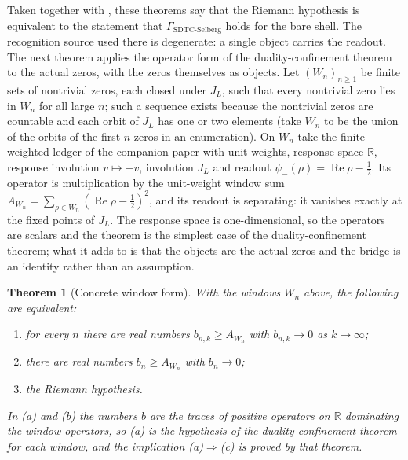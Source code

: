 \documentclass[11pt]{article}
\DeclareMathOperator{\Real}{Re}
\newcommand{\JL}{J_{L}}
\newcommand{\psimRH}{\psi_{-}}
\newcommand{\GamSDTCSelberg}{\Gamma_{\mathrm{SDTC\text{-}Selberg}}}
\newtheorem{theorem}{Theorem}[section]
\theoremstyle{definition}
\begin{document}
Taken together with , these theorems
say that the Riemann hypothesis is equivalent to the statement that \(\GamSDTCSelberg\) holds for the bare shell.  The recognition source
used there is degenerate: a single object carries the readout.  The
next theorem applies the operator form of the duality-confinement
theorem to the actual zeros, with the zeros themselves as objects.
  Let
\((W_n)_{n\geq1}\) be finite sets of nontrivial zeros, each closed under
\(\JL\), such that every nontrivial zero lies in \(W_n\) for all large
\(n\); such a sequence exists because the nontrivial zeros are countable and
each orbit of \(\JL\) has one or two elements (take \(W_n\) to be the
union of the orbits of the first \(n\) zeros in an enumeration).  On
\(W_n\) take the finite weighted ledger of the companion
paper with unit weights, response space \(\mathbb R\), response
involution \(v\mapsto-v\), involution \(\JL\) and readout
\(\psimRH(\rho)=\Real\rho-\frac12\).  Its operator is multiplication by the unit-weight window sum
\(A_{W_n}=\sum_{\rho\in W_n}(\Real\rho-\frac12)^2\), and its readout is
separating: it vanishes exactly at the fixed points of \(\JL\).  The
response space is one-dimensional, so the operators are scalars and the
theorem is the simplest case of the duality-confinement theorem; what
it adds to  is that the objects are the
actual zeros and the bridge is an identity rather than an
assumption.

\begin{theorem}[Concrete window form]
\label{thm:rh:concrete-window-dc}
With the windows \(W_n\) above, the following are equivalent:
\begin{enumerate}[label=\textup{(\alph*)}]
  \item for every \(n\) there are real numbers \(b_{n,k}\geq A_{W_n}\)
    with \(b_{n,k}\to0\) as \(k\to\infty\);
  \item there are real numbers \(b_n\geq A_{W_n}\) with \(b_n\to0\);
  \item the Riemann hypothesis.
\end{enumerate}
In (a) and (b) the numbers \(b\) are the traces of positive operators
on \(\mathbb R\) dominating the window operators, so (a) is the
hypothesis of the duality-confinement theorem for each window, and the
implication (a)\(\Rightarrow\)(c) is proved by that theorem.
\end{theorem}
\end{document}
